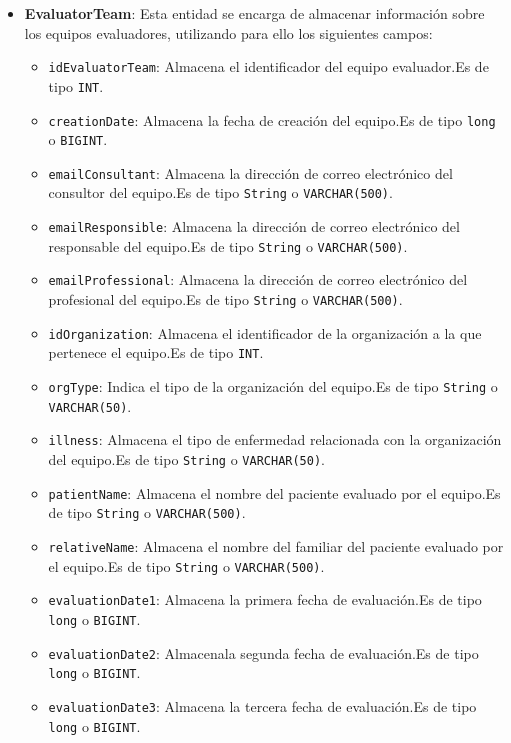 \begin{itemize}
    \item \textbf{EvaluatorTeam}: Esta entidad se encarga de almacenar información sobre los equipos evaluadores, utilizando para ello los siguientes campos:
        \begin{itemize}
        \item \texttt{idEvaluatorTeam}: Almacena el identificador del equipo evaluador.Es de tipo \texttt{INT}.
        \item \texttt{creationDate}: Almacena la fecha de creación del equipo.Es de tipo \texttt{long} o \texttt{BIGINT}.
        \item \texttt{emailConsultant}: Almacena la dirección de correo electrónico del consultor del equipo.Es de tipo \texttt{String} o \texttt{VARCHAR(500)}.
        \item \texttt{emailResponsible}: Almacena la dirección de correo electrónico del responsable del equipo.Es de tipo \texttt{String} o \texttt{VARCHAR(500)}.
        \item \texttt{emailProfessional}: Almacena la dirección de correo electrónico del profesional del equipo.Es de tipo \texttt{String} o \texttt{VARCHAR(500)}.
        \item \texttt{idOrganization}: Almacena el identificador de la organización a la que pertenece el equipo.Es de tipo \texttt{INT}.
        \item \texttt{orgType}: Indica el tipo de la organización del equipo.Es de tipo \texttt{String} o \texttt{VARCHAR(50)}.
        \item \texttt{illness}: Almacena el tipo de enfermedad relacionada con la organización del equipo.Es de tipo \texttt{String} o \texttt{VARCHAR(50)}.
        \item \texttt{patientName}: Almacena el nombre del paciente evaluado por el equipo.Es de tipo \texttt{String} o \texttt{VARCHAR(500)}.
        \item \texttt{relativeName}: Almacena el nombre del familiar del paciente evaluado por el equipo.Es de tipo \texttt{String} o \texttt{VARCHAR(500)}.
        \item \texttt{evaluationDate1}: Almacena la primera fecha de evaluación.Es de tipo \texttt{long} o \texttt{BIGINT}.
        \item \texttt{evaluationDate2}: Almacenala segunda fecha de evaluación.Es de tipo \texttt{long} o \texttt{BIGINT}.
        \item \texttt{evaluationDate3}: Almacena la tercera fecha de evaluación.Es de tipo \texttt{long} o \texttt{BIGINT}.

\end{itemize}
\end{itemize}
